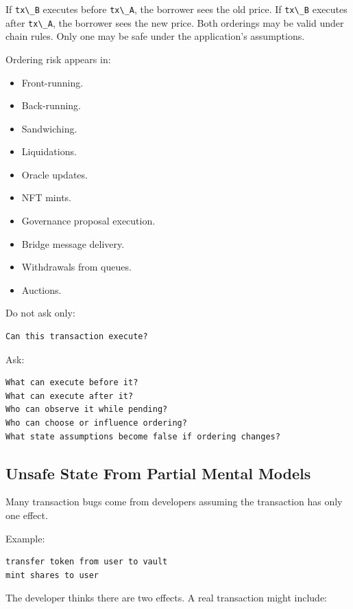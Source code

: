 If \passthrough{\lstinline!tx\_B!} executes before
\passthrough{\lstinline!tx\_A!}, the borrower sees the old price. If
\passthrough{\lstinline!tx\_B!} executes after
\passthrough{\lstinline!tx\_A!}, the borrower sees the new price. Both
orderings may be valid under chain rules. Only one may be safe under the
application's assumptions.

Ordering risk appears in:

\begin{itemize}
\tightlist
\item
  Front-running.
\item
  Back-running.
\item
  Sandwiching.
\item
  Liquidations.
\item
  Oracle updates.
\item
  NFT mints.
\item
  Governance proposal execution.
\item
  Bridge message delivery.
\item
  Withdrawals from queues.
\item
  Auctions.
\end{itemize}

Do not ask only:

\begin{lstlisting}
Can this transaction execute?
\end{lstlisting}

Ask:

\begin{lstlisting}
What can execute before it?
What can execute after it?
Who can observe it while pending?
Who can choose or influence ordering?
What state assumptions become false if ordering changes?
\end{lstlisting}

\subsection{Unsafe State From Partial Mental Models}

Many transaction bugs come from developers assuming the transaction has
only one effect.

Example:

\begin{lstlisting}
transfer token from user to vault
mint shares to user
\end{lstlisting}

The developer thinks there are two effects. A real transaction might
include:

